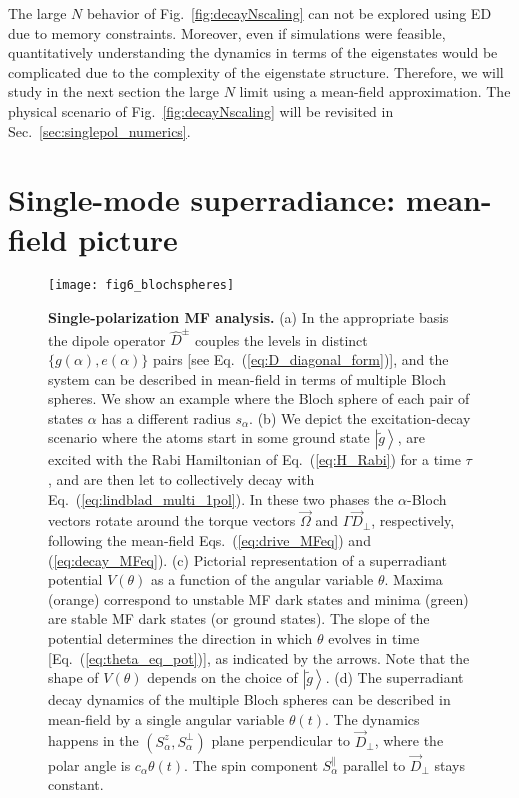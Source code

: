 \documentclass[aps,prx,superscriptaddress,twocolumn,notitlepage,nofootinbib,longbibliography]{revtex4-2}
\newcommand{\ket}[1]{\left|#1\right>}
\begin{document}
The large $N$ behavior of Fig.~\ref{fig:decayNscaling} can not be explored using ED due to memory constraints. Moreover, even if simulations were feasible, quantitatively understanding the dynamics in terms of the eigenstates would be complicated due to the complexity of the eigenstate structure.
Therefore, we will study in the next section the large $N$ limit using a mean-field approximation.
The physical scenario of Fig.~\ref{fig:decayNscaling} will be revisited in Sec.~\ref{sec:singlepol_numerics}.








\section{Single-mode superradiance: mean-field picture\label{sec:MFpicture}}

\begin{figure*}[!t]
\centering
\texttt{[image: fig6\_blochspheres]}
\caption{\textbf{Single-polarization MF analysis.} (a) In the appropriate basis the dipole operator $\hat{D}^\pm$ couples the levels in distinct $\{g(\alpha),e(\alpha)\}$ pairs [see Eq.~(\ref{eq:D_diagonal_form})], and the system can be described in mean-field in terms of multiple Bloch spheres. We show an example where the Bloch sphere of each pair of states $\alpha$ has a different radius $s_\alpha$. (b) We depict the excitation-decay scenario where the atoms start in some ground state $\ket{\tilde{g}}$, are excited with the Rabi Hamiltonian of Eq.~(\ref{eq:H_Rabi}) for a time $\tau$, and are then let to collectively decay with Eq.~(\ref{eq:lindblad_multi_1pol}). In these two phases the $\alpha$-Bloch vectors rotate around the torque vectors $\vec{\Omega}$ and $\Gamma \vec{D}_\perp$, respectively, following the mean-field Eqs.~(\ref{eq:drive_MFeq}) and (\ref{eq:decay_MFeq}). (c) Pictorial representation of a superradiant potential $V(\theta)$ as a function of the angular variable $\theta$. Maxima (orange) correspond to unstable MF dark states and minima (green) are stable MF dark states (or ground states). The slope of the potential determines the direction in which $\theta$ evolves in time [Eq.~(\ref{eq:theta_eq_pot})], as indicated by the arrows. Note that the shape of $V(\theta)$ depends on the choice of $\ket{\tilde{g}}$. (d) The superradiant decay dynamics of the multiple Bloch spheres can be described in mean-field by a single angular variable $\theta(t)$. The dynamics happens in the $(S^z_\alpha,S^\perp_\alpha)$ plane perpendicular to $\vec{D}_\perp$, where the polar angle is $c_\alpha \theta(t)$. The spin component $S^\parallel_\alpha$ parallel to $\vec{D}_\perp$ stays constant.}
\label{fig:blochspheres}
\end{figure*}
\end{document}
